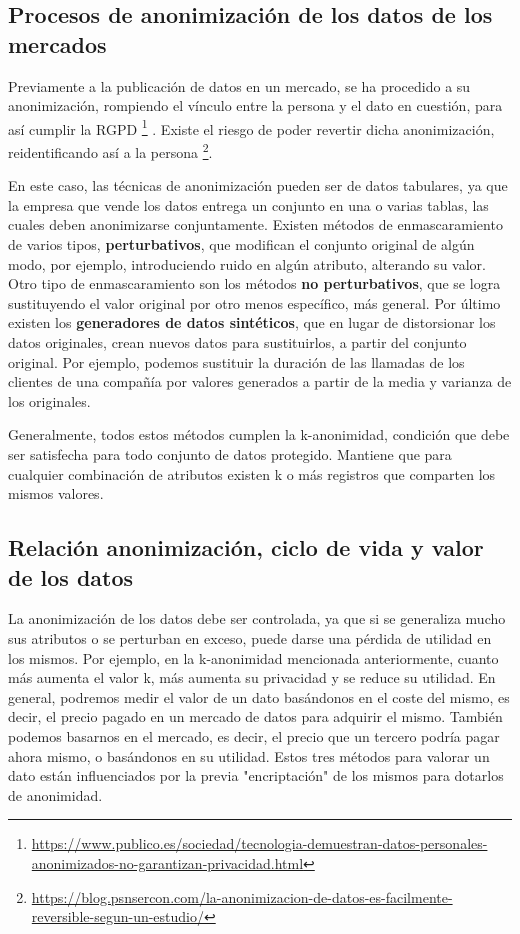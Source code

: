 \documentclass{article}
\begin{document}
\subsection{Procesos de anonimización de los datos de los mercados}

Previamente a la publicación de datos en un mercado, se ha procedido a su anonimización, rompiendo el vínculo entre la persona y el dato en cuestión, para así cumplir la RGPD \footnote{\url{https://www.publico.es/sociedad/tecnologia-demuestran-datos-personales-anonimizados-no-garantizan-privacidad.html}} . Existe el riesgo de poder revertir dicha anonimización, reidentificando así a la persona \footnote{\url{https://blog.psnsercon.com/la-anonimizacion-de-datos-es-facilmente-reversible-segun-un-estudio/}}.

En este caso, las técnicas de anonimización pueden ser de datos tabulares, ya que la empresa que vende los datos entrega un conjunto en una o varias tablas, las cuales deben anonimizarse conjuntamente. Existen métodos de enmascaramiento de varios tipos, \textbf{perturbativos}, que modifican el conjunto original de algún modo, por ejemplo, introduciendo ruido en algún atributo, alterando su valor. Otro tipo de enmascaramiento son los métodos \textbf{no perturbativos}, que se logra sustituyendo el valor original por otro menos específico, más general. Por último existen los \textbf{generadores de datos sintéticos}, que en lugar de distorsionar los datos originales, crean nuevos datos para sustituirlos, a partir del conjunto original. Por ejemplo, podemos sustituir la duración de las llamadas de los clientes de una compañía por valores generados a partir de la media y varianza de los originales.

Generalmente, todos estos métodos cumplen la k-anonimidad, condición que debe ser satisfecha para todo conjunto de datos protegido. Mantiene que para cualquier combinación de atributos existen k o más registros que comparten los mismos valores.

\subsection{Relación anonimización, ciclo de vida y valor de los datos}
La anonimización de los datos debe ser controlada, ya que si se generaliza mucho sus atributos o se perturban en exceso, puede darse una pérdida de utilidad en los mismos. Por ejemplo, en la k-anonimidad mencionada anteriormente, cuanto más aumenta el valor k, más aumenta su privacidad y se reduce su utilidad. En general, podremos medir el valor de un dato basándonos en el coste del mismo, es decir, el precio pagado en un mercado de datos para adquirir el mismo. También podemos basarnos en el mercado, es decir, el precio que un tercero podría pagar ahora mismo, o basándonos en su utilidad. Estos tres métodos para valorar un dato están influenciados por la previa "encriptación" de los mismos para dotarlos de anonimidad.
\end{document}
